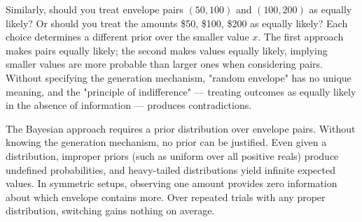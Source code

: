 Similarly, should you treat envelope pairs $(50, 100)$ and $(100, 200)$ as equally likely? Or should you treat the amounts \$50, \$100, \$200 as equally likely? Each choice determines a different prior over the smaller value $x$. The first approach makes pairs equally likely; the second makes values equally likely, implying smaller values are more probable than larger ones when considering pairs. Without specifying the generation mechanism, "random envelope" has no unique meaning, and the "principle of indifference" — treating outcomes as equally likely in the absence of information — produces contradictions.

The Bayesian approach requires a prior distribution over envelope pairs. Without knowing the generation mechanism, no prior can be justified. Even given a distribution, improper priors (such as uniform over all positive reals) produce undefined probabilities, and heavy-tailed distributions yield infinite expected values. In symmetric setups, observing one amount provides zero information about which envelope contains more. Over repeated trials with any proper distribution, switching gains nothing on average.

